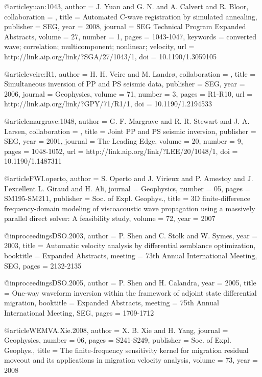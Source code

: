 {@article{yuan:1043,
author = {J. Yuan and G. N. and A. Calvert and
                  R. Bloor},
collaboration = {},
title = {Automated {C}-wave registration by simulated annealing},
publisher = {SEG},
year = {2008},
journal = {SEG Technical Program Expanded Abstracts},
volume = {27},
number = {1},
pages = {1043-1047},
keywords = {converted wave; correlation; multicomponent; nonlinear;
                  velocity},
url = {http://link.aip.org/link/?SGA/27/1043/1},
doi = {10.1190/1.3059105}
}

@article{veire:R1,
author = {H. H. Veire and M. Landr\o},
collaboration = {},
title = {Simultaneous inversion of {PP} and {PS} seismic data},
publisher = {SEG},
year = {2006},
journal = {Geophysics},
volume = {71},
number = {3},
pages = {R1-R10},
url = {http://link.aip.org/link/?GPY/71/R1/1},
doi = {10.1190/1.2194533}
}

@article{margrave:1048,
author = {G. F. Margrave and R. R. Stewart and J. A. Larsen},
collaboration = {},
title = {Joint {PP} and {PS} seismic inversion},
publisher = {SEG},
year = {2001},
journal = {The Leading Edge},
volume = {20},
number = {9},
pages = {1048-1052},
url = {http://link.aip.org/link/?LEE/20/1048/1},
doi = {10.1190/1.1487311}
}







@article{FWI.operto,
  author = { S. Operto and J. Virieux and P. Amestoy and J.
I'excellent L. Giraud and H. Ali},
  journal = {Geophysics},
  number = {05},
  pages = {SM195-SM211},
  publisher = {Soc. of Expl. Geophys.},
  title = { 3{D} finite-difference frequency-domain modeling of
viscoacoustic wave propagation using a massively parallel direct
solver: A feasibility study},
  volume = {72},
  year = {2007}}

@inproceedings{DSO.2003,
  author    = {P. Shen and C. Stolk and W. Symes},
  year      = {2003},
  title     = {Automatic velocity analysis by differential semblance
optimization},
  booktitle = {Expanded Abstracts},
  meeting   = {73th Annual International Meeting, SEG},
  pages     = {2132-2135}
}

@inproceedings{DSO.2005,
  author    = {P. Shen and H. Calandra},
  year      = {2005},
  title     = {One-way waveform inversion within the framework of
adjoint state differential migration},
  booktitle = {Expanded Abstracts},
  meeting   = {75th Annual International Meeting, SEG},
  pages     = {1709-1712}
}

@article{WEMVA.Xie.2008,
  author = { X. B. Xie and H. Yang},
  journal = {Geophysics},
  number = {06},
  pages = {S241-S249},
  publisher = {Soc. of Expl. Geophys.},
  title = {The finite-frequency sensitivity kernel for migration
residual moveout and its applications in migration velocity analysis},
  volume = {73},
  year = {2008}}

}
